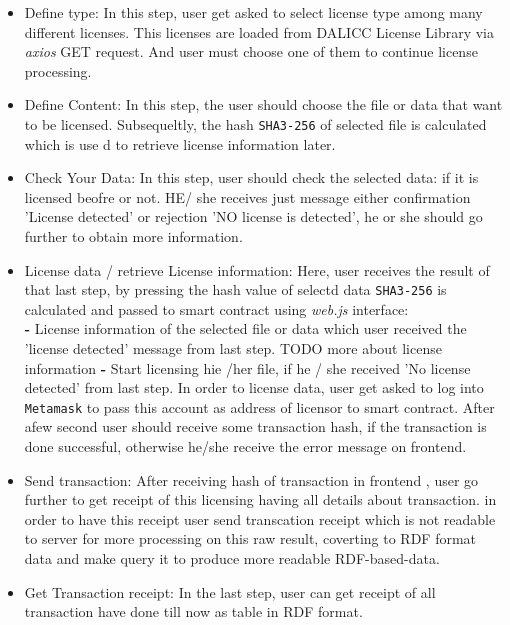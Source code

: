 \begin{itemize}
	\item Define type:
	In this step, user get asked to select license type among many different licenses. This licenses are loaded from DALICC License Library via \textit{axios} GET request. And user must choose one of them to continue license processing.
	\item Define Content:
	In this step, the user should choose the file or data that want to be licensed. Subsequeltly, the hash \texttt{SHA3-256} of selected file is calculated which is use d to retrieve license information later.
	\item Check Your Data:
	In this step, user should check the selected data: if it is licensed beofre or not. HE/ she receives just message either confirmation 'License detected' or rejection 'NO license is detected', he or she should go further to obtain more information.
	\item License data / retrieve License information:
	Here, user receives the result of that last step, by pressing the hash value of selectd data \texttt{SHA3-256} is calculated and passed to smart contract using \textit{web.js} interface: \\
	\textbf{- } License information of the selected file or data which user received the 'license detected' message from last step. TODO more about license information
	\textbf{- } Start licensing hie /her file, if he / she received 'No license detected'  from last step. In order to license data, user get asked to log into \texttt{Metamask} to pass this account as address of licensor to smart contract. After afew second user should receive some transaction hash,  if the transaction is done successful, otherwise he/she receive the error message on frontend.
	\item Send transaction: After receiving hash of transaction in frontend , user go further to get receipt of this licensing having all details about transaction. in order to have this receipt user send transcation receipt which is not readable to server for more processing on this raw result, coverting to RDF format data and make query it to produce more readable RDF-based-data.
	\item Get Transaction receipt:
	In the last step, user can get receipt of all transaction have done till now as table in RDF format.
\end{itemize}

